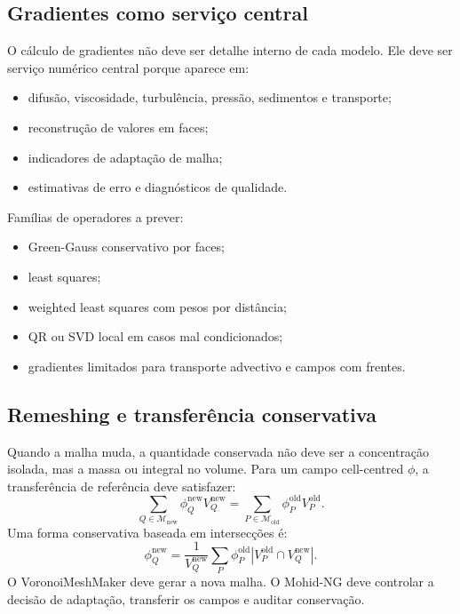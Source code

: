 \documentclass[11pt,a4paper]{article}
\begin{document}
\subsection{Gradientes como servi\c{c}o central}

O c\'alculo de gradientes n\~ao deve ser detalhe interno de cada modelo. Ele deve ser servi\c{c}o num\'erico central porque aparece em:
\begin{itemize}
  \item difus\~ao, viscosidade, turbul\^encia, press\~ao, sedimentos e transporte;
  \item reconstru\c{c}\~ao de valores em faces;
  \item indicadores de adapta\c{c}\~ao de malha;
  \item estimativas de erro e diagn\'osticos de qualidade.
\end{itemize}

Fam\'ilias de operadores a prever:
\begin{itemize}
  \item Green-Gauss conservativo por faces;
  \item least squares;
  \item weighted least squares com pesos por dist\^ancia;
  \item QR ou SVD local em casos mal condicionados;
  \item gradientes limitados para transporte advectivo e campos com frentes.
\end{itemize}

\subsection{Remeshing e transfer\^encia conservativa}

Quando a malha muda, a quantidade conservada n\~ao deve ser a concentra\c{c}\~ao isolada, mas a massa ou integral no volume. Para um campo cell-centred \(\phi\), a transfer\^encia de refer\^encia deve satisfazer:
\[
\sum_{Q\in\mathcal{M}_{\mathrm{new}}}\phi_Q^{\mathrm{new}}V_Q^{\mathrm{new}}
=
\sum_{P\in\mathcal{M}_{\mathrm{old}}}\phi_P^{\mathrm{old}}V_P^{\mathrm{old}}.
\]
Uma forma conservativa baseada em intersec\c{c}\~oes \'e:
\[
\phi_Q^{\mathrm{new}}
=
\frac{1}{V_Q^{\mathrm{new}}}
\sum_P \phi_P^{\mathrm{old}}\left|V_P^{\mathrm{old}}\cap V_Q^{\mathrm{new}}\right|.
\]
O VoronoiMeshMaker deve gerar a nova malha. O Mohid-NG deve controlar a decis\~ao de adapta\c{c}\~ao, transferir os campos e auditar conserva\c{c}\~ao.
\end{document}
